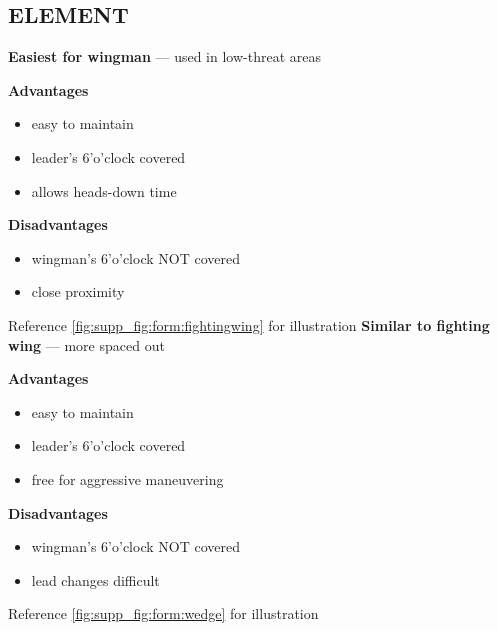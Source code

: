 \subsection{ELEMENT}

\begin{tcoloritemize}
    \textbf{Easiest for wingman} --- used in low-threat areas

    \medskip

    \textbf{Advantages}
    \begin{itemize}
        \item easy to maintain
        \item leader's 6'o'clock covered
        \item allows heads-down time
    \end{itemize}

    \textbf{Disadvantages}
    \begin{itemize}
        \item wingman's 6'o'clock NOT covered
        \item close proximity
    \end{itemize}

    Reference \cref{fig:supp_fig:form:fightingwing} for illustration
    \blueitem[Wedge]
    \textbf{Similar to fighting wing} --- more spaced out
    
    \medskip

    \textbf{Advantages}
    \begin{itemize}
        \item easy to maintain
        \item leader's 6'o'clock covered
        \item free for aggressive maneuvering
    \end{itemize}

    \textbf{Disadvantages}
    \begin{itemize}
        \item wingman's 6'o'clock NOT covered
        \item lead changes difficult
    \end{itemize}

    Reference \cref{fig:supp_fig:form:wedge} for illustration
\end{tcoloritemize}

